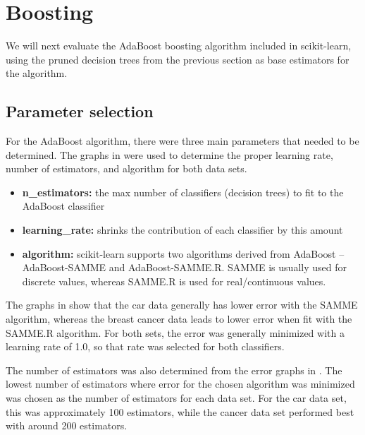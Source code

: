 \documentclass{article}
\begin{document}
    \section{Boosting}
    We will next evaluate the AdaBoost boosting algorithm included in scikit-learn, using the pruned decision trees from the previous section as base estimators for the algorithm.

    \subsection{Parameter selection}
    For the AdaBoost algorithm, there were three main parameters that needed to be determined. The graphs in  were used to determine the proper learning rate, number of estimators, and algorithm for both data sets.

    \begin{itemize}
        \item \textbf{n\_estimators:} the max number of classifiers (decision trees) to fit to the AdaBoost classifier
        \item \textbf{learning\_rate:} shrinks the contribution of each classifier by this amount
        \item \textbf{algorithm:} scikit-learn supports two algorithms derived from AdaBoost -- AdaBoost-SAMME and AdaBoost-SAMME.R. SAMME is usually used for discrete values, whereas SAMME.R is used for real/continuous values. 
    \end{itemize}

    The graphs in  show that the car data generally has lower error with the SAMME algorithm, whereas the breast cancer data leads to lower error when fit with the SAMME.R algorithm. For both sets, the error was generally minimized with a learning rate of 1.0, so that rate was selected for both classifiers.

    The number of estimators was also determined from the error graphs in . The lowest number of estimators where error for the chosen algorithm was minimized was chosen as the number of estimators for each data set. For the car data set, this was approximately 100 estimators, while the cancer data set performed best with around 200 estimators.
\end{document}
